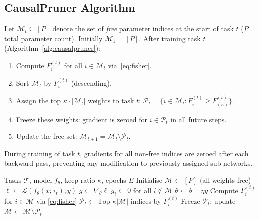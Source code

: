 \documentclass[conference]{IEEEtran}
\begin{document}
\subsection{CausalPruner Algorithm}

Let $\mathcal{M}_t \subseteq [P]$ denote the set of \emph{free} parameter indices at the
start of task $t$ ($P$ = total parameter count).  Initially $\mathcal{M}_1 = [P]$.
After training task $t$ (Algorithm~\ref{alg:causalpruner}):

\begin{enumerate}
    \item Compute $F_i^{(t)}$ for all $i \in \mathcal{M}_t$ via~\eqref{eq:fisher}.
    \item Sort $\mathcal{M}_t$ by $F_i^{(t)}$ (descending).
    \item Assign the top $\kappa \cdot |\mathcal{M}_t|$ weights to task $t$:
          $\mathcal{P}_t = \{i \in \mathcal{M}_t : F_i^{(t)} \geq F_{(\kappa)}^{(t)}\}$.
    \item Freeze these weights: gradient is zeroed for $i \in \mathcal{P}_t$ in all future steps.
    \item Update the free set: $\mathcal{M}_{t+1} = \mathcal{M}_t \setminus \mathcal{P}_t$.
\end{enumerate}

During training of task $t$, gradients for all non-free indices are zeroed after each
backward pass, preventing any modification to previously assigned sub-networks.

\begin{algorithm}
\caption{CausalPruner}
\label{alg:causalpruner}
\begin{algorithmic}[1]
\REQUIRE Tasks $\mathcal{T}$, model $f_\theta$, keep ratio $\kappa$, epochs $E$
\STATE Initialise $\mathcal{M} \leftarrow [P]$ (all weights free)
            \STATE $\ell \leftarrow \mathcal{L}(f_\theta(x;\tau_t), y)$
            \STATE $g \leftarrow \nabla_\theta \ell$
            \STATE $g_i \leftarrow 0$ for all $i \notin \mathcal{M}$ 
            \STATE $\theta \leftarrow \theta - \eta g$
        \ENDFOR
    \ENDFOR
    \STATE Compute $F_i^{(t)}$ for $i \in \mathcal{M}$ via \eqref{eq:fisher}
    \STATE $\mathcal{P}_t \leftarrow \text{Top-}\kappa|\mathcal{M}|$ indices by $F_i^{(t)}$
    \STATE Freeze $\mathcal{P}_t$; update $\mathcal{M} \leftarrow \mathcal{M} \setminus \mathcal{P}_t$
\ENDFOR
\end{algorithmic}
\end{algorithm}
\end{document}
